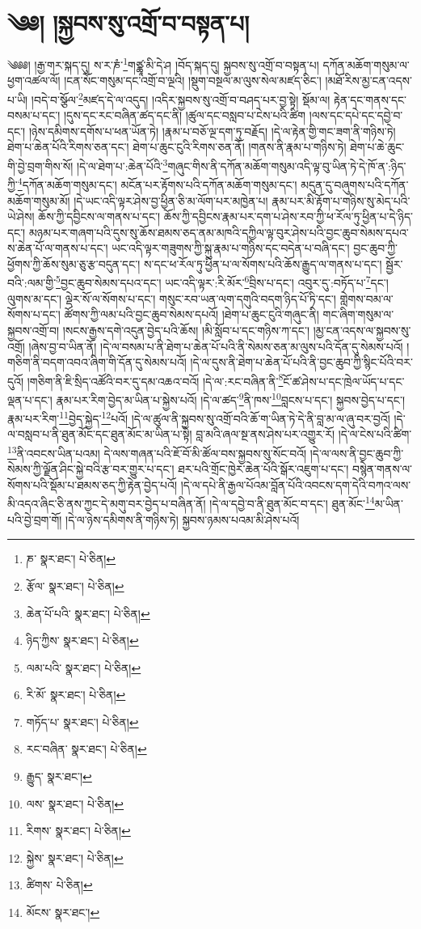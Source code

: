 \setcounter{footnote}{0} 
\chapter{༄༅། །སྐྱབས་སུ་འགྲོ་བ་བསྟན་པ།}༄༅༅། །རྒྱ་གར་སྐད་དུ། ས་ར་ཎཾ་\footnote{ཎ་  སྣར་ཐང་།  པེ་ཅིན། }གཙྪཱ་མི་དེ་ཤ །བོད་སྐད་དུ། སྐྱབས་སུ་འགྲོ་བ་བསྟན་པ། དཀོན་མཆོག་གསུམ་ལ་ཕྱག་འཚལ་ལོ། །ངན་སོང་གསུམ་དང་འགྲོ་བ་ལྔའི། །སྡུག་བསྔལ་མ་ལུས་སེལ་མཛད་ཅིང་། །མཐོ་རིས་མྱ་ངན་འདས་པ་ཡི། །བདེ་བ་སྩོལ་\footnote{རྩོལ་  སྣར་ཐང་།  པེ་ཅིན། }མཛད་དེ་ལ་འདུད། །འདིར་སྐྱབས་སུ་འགྲོ་བ་བཤད་པར་བྱ་སྟེ། སྡོམ་ལ། རྟེན་དང་གནས་དང་བསམ་པ་དང་། །དུས་དང་རང་བཞིན་ཚད་དང་ནི། །ཚུལ་དང་བསླབ་པ་ངེས་པའི་ཚིག །ལས་དང་དཔེ་དང་དབྱེ་བ་དང་། །ཉེས་དམིགས་དགོས་པ་ཕན་ཡོན་ཏེ། །རྣམ་པ་བཅོ་ལྔ་དག་ཏུ་བརྗོད། །དེ་ལ་རྟེན་གྱི་གང་ཟག་ནི་གཉིས་ཏེ། ཐེག་པ་ཆེན་པོའི་རིགས་ཅན་དང་། ཐེག་པ་ཆུང་ངུའི་རིགས་ཅན་ནོ། །གནས་ནི་རྣམ་པ་གཉིས་ཏེ། ཐེག་པ་ཆེ་ཆུང་གི་བྱེ་བྲག་གིས་སོ། །དེ་ལ་ཐེག་པ་:ཆེན་པོའི་\footnote{ཆེན་པོ་པའི་  སྣར་ཐང་།  པེ་ཅིན། }གཞུང་གིས་ནི་དཀོན་མཆོག་གསུམ་འདི་ལྟ་བུ་ཡིན་ཏེ་དེ་ཁོ་ན་:ཉིད་ཀྱི་\footnote{ཉིད་ཀྱིས་  སྣར་ཐང་།  པེ་ཅིན། }དཀོན་མཆོག་གསུམ་དང་། མངོན་པར་རྟོགས་པའི་དཀོན་མཆོག་གསུམ་དང་། མདུན་དུ་བཞུགས་པའི་དཀོན་མཆོག་གསུམ་མོ། །དེ་ཡང་འདི་ལྟར་ཤེས་བྱ་ཕྱིན་ཅི་མ་ལོག་པར་མཁྱེན་པ། རྣམ་པར་མི་རྟོག་པ་གཉིས་སུ་མེད་པའི་ཡེ་ཤེས། ཆོས་ཀྱི་དབྱིངས་ལ་གནས་པ་དང་། ཆོས་ཀྱི་དབྱིངས་རྣམ་པར་དག་པ་ཤེས་རབ་ཀྱི་ཕ་རོལ་ཏུ་ཕྱིན་པ་དེ་ཉིད་དང་། མཉམ་པར་གཞག་པའི་དུས་སུ་ཆོས་ཐམས་ཅད་ནམ་མཁའི་དཀྱིལ་ལྟ་བུར་ཤེས་པའི་བྱང་ཆུབ་སེམས་དཔའ་ས་ཆེན་པོ་ལ་གནས་པ་དང་། ཡང་འདི་ལྟར་གཟུགས་ཀྱི་སྐུ་རྣམ་པ་གཉིས་དང་བདེན་པ་བཞི་དང་། བྱང་ཆུབ་ཀྱི་ཕྱོགས་ཀྱི་ཆོས་སུམ་ཅུ་རྩ་བདུན་དང་། ས་དང་ཕ་རོལ་ཏུ་ཕྱིན་པ་ལ་སོགས་པའི་ཆོས་རྒྱུད་ལ་གནས་པ་དང་། སྦྱོར་བའི་:ལམ་གྱི་\footnote{ལམ་པའི་  སྣར་ཐང་།  པེ་ཅིན། }བྱང་ཆུབ་སེམས་དཔའ་དང་། ཡང་འདི་ལྟར་:རི་མོར་\footnote{རི་མོ་  སྣར་ཐང་།  པེ་ཅིན། }བྲིས་པ་དང་། འབུར་དུ་:བཏོད་པ་\footnote{གཏོད་པ་  སྣར་ཐང་།  པེ་ཅིན། }དང་། ལུགས་མ་དང་། ལྡེར་སོ་ལ་སོགས་པ་དང་། གསུང་རབ་ཡན་ལག་དགུའི་བདག་ཉིད་པོ་ཏི་དང་། གླེགས་བམ་ལ་སོགས་པ་དང་། ཚོགས་ཀྱི་ལམ་པའི་བྱང་ཆུབ་སེམས་དཔའོ། །ཐེག་པ་ཆུང་ངུའི་གཞུང་ནི། གང་ཞིག་གསུམ་ལ་སྐྱབས་འགྲོ་བ། །སངས་རྒྱས་དགེ་འདུན་བྱེད་པའི་ཆོས། །མི་སློབ་པ་དང་གཉིས་ཀ་དང་། །མྱ་ངན་འདས་ལ་སྐྱབས་སུ་འགྲོ། །ཞེས་བྱ་བ་ཡིན་ནོ། །དེ་ལ་བསམ་པ་ནི་ཐེག་པ་ཆེན་པོ་པའི་ནི་སེམས་ཅན་མ་ལུས་པའི་དོན་དུ་སེམས་པའོ། །གཅིག་ནི་བདག་འབའ་ཞིག་གི་དོན་དུ་སེམས་པའོ། །དེ་ལ་དུས་ནི་ཐེག་པ་ཆེན་པོ་པའི་ནི་བྱང་ཆུབ་ཀྱི་སྙིང་པོའི་བར་དུའོ། །གཅིག་ནི་ཇི་སྲིད་འཚོའི་བར་དུ་དམ་འཆའ་བའོ། །དེ་ལ་:རང་བཞིན་ནི་\footnote{རང་བཞིན་  སྣར་ཐང་།  པེ་ཅིན། }ངོ་ཚ་ཤེས་པ་དང་ཁྲེལ་ཡོད་པ་དང་ལྡན་པ་དང་། རྣམ་པར་རིག་བྱེད་མ་ཡིན་པ་སྐྱེས་པའོ། །དེ་ལ་ཚད་\footnote{རྒྱུད་  སྣར་ཐང་། }ནི་ཁས་\footnote{ལས་  སྣར་ཐང་།  པེ་ཅིན། }བླངས་པ་དང་། སྐྱབས་བྱེད་པ་དང་། རྣམ་པར་རིག་\footnote{རིགས་  སྣར་ཐང་།  པེ་ཅིན། }བྱེད་སྐྱེད་\footnote{སྐྱེས་  སྣར་ཐང་།  པེ་ཅིན། }པའོ། །དེ་ལ་ཚུལ་ནི་སྐྱབས་སུ་འགྲོ་བའི་ཆོ་ག་ཡིན་ཏེ་དེ་ནི་བླ་མ་ལ་ཞུ་བར་བྱའོ། །དེ་ལ་བསླབ་པ་ནི་ཐུན་མོང་དང་ཐུན་མོང་མ་ཡིན་པ་སྟེ། བླ་མའི་ཞལ་སྔ་ནས་ཤེས་པར་འགྱུར་རོ། །དེ་ལ་ངེས་པའི་ཚིག་\footnote{ཚིགས་  པེ་ཅིན། }ནི་འབངས་ཡིན་པའམ། དེ་ལས་གཞན་པའི་ཇོ་བོ་མི་ཚོལ་བས་སྐྱབས་སུ་སོང་བའོ། །དེ་ལ་ལས་ནི་བྱང་ཆུབ་ཀྱི་སེམས་ཀྱི་ལྗོན་ཤིང་སྐྱེ་བའི་རྩ་བར་གྱུར་པ་དང་། ཐར་པའི་གྲོང་ཁྱེར་ཆེན་པོའི་སྒོར་འཇུག་པ་དང་། བསྙེན་གནས་ལ་སོགས་པའི་སྡོམ་པ་ཐམས་ཅད་ཀྱི་རྟེན་བྱེད་པའོ། །དེ་ལ་དཔེ་ནི་རྒྱལ་པོའམ་བློན་པོའི་འབངས་དག་དེའི་བཀའ་ལས་མི་འདའ་ཞིང་ཅི་ནས་ཀྱང་དེ་མགུ་བར་བྱེད་པ་བཞིན་ནོ། །དེ་ལ་དབྱེ་བ་ནི་ཐུན་མོང་བ་དང་། ཐུན་མོང་\footnote{མོངས་  སྣར་ཐང་། }མ་ཡིན་པའི་བྱེ་བྲག་གོ། །དེ་ལ་ཉེས་དམིགས་ནི་གཉིས་ཏེ། སྐྱབས་ཉམས་པའམ་མི་ཤེས་པའོ། 